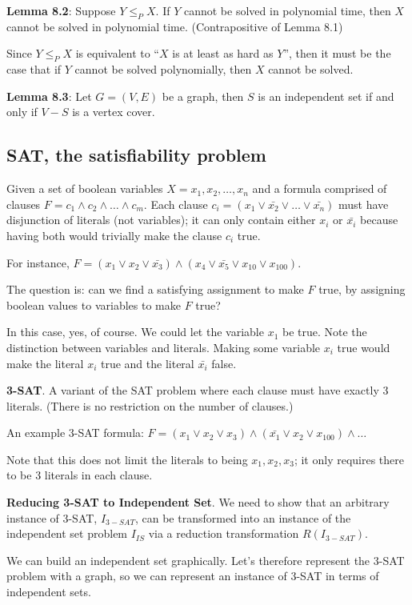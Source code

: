 \documentclass{article}
\begin{document}
\textbf{Lemma 8.2}: Suppose $Y \leq_{P} X$. If $Y$ cannot be solved in polynomial time, then $X$ cannot be solved in polynomial time. (Contrapositive of Lemma 8.1)

Since $Y \leq_{P} X$ is equivalent to ``$X$ is at least as hard as $Y$'', then it must be the case that if $Y$ cannot be solved polynomially, then $X$ cannot be solved.

\textbf{Lemma 8.3}: Let $G = (V, E)$ be a graph, then $S$ is an independent set if and only if $V - S$ is a vertex cover.

\subsection{SAT, the satisfiability problem}

Given a set of boolean variables $X = x_1, x_2, \dots, x_n$ and a formula comprised of clauses $F = c_1 \wedge c_2 \wedge \dots \wedge c_m$. Each clause $c_i = (x_1 \vee \bar{x_2} \vee \dots \vee \bar{x_n})$ must have disjunction of literals (not variables); it can only contain either $x_i$ or $\bar{x_i}$ because having both would trivially make the clause $c_i$ true.

For instance, $F = (x_1 \vee x_2 \vee \bar{x_3}) \wedge (x_4 \vee \bar{x_5} \vee x_{10} \vee x_{100})$.

The question is: can we find a satisfying assignment to make $F$ true, by assigning boolean values to variables to make $F$ true?

In this case, yes, of course. We could let the variable $x_1$ be true. Note the distinction between variables and literals. Making some variable $x_i$ true would make the literal $x_i$ true and the literal $\bar{x_i}$ false.

\textbf{3-SAT}. A variant of the SAT problem where each clause must have exactly 3 literals. (There is no restriction on the number of clauses.)

An example 3-SAT formula: $F = (x_1 \vee x_2 \vee x_3) \wedge (\bar{x_1} \vee x_2 \vee x_{100}) \wedge \dots$

Note that this does not limit the literals to being $x_1, x_2, x_3$; it only requires there to be 3 literals in each clause.

\textbf{Reducing 3-SAT to Independent Set}.
We need to show that an arbitrary instance of 3-SAT, $I_{3-SAT}$, can be transformed into an instance of the independent set problem $I_{IS}$ via a reduction transformation $R(I_{3-SAT})$.

We can build an independent set graphically. Let's therefore represent the 3-SAT problem with a graph, so we can represent an instance of 3-SAT in terms of independent sets.
\end{document}
